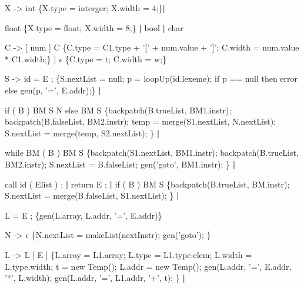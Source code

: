 \documentclass{ML}
\begin{document}
\begin{enumerate}
{    \item X -> int {\color{red}\{X.type = interger; X.width = 4;\}}\textbf{|} 
    
    \hspace{1cm}float {\color{red}\{X.type = float; X.width = 8;\}} \textbf{|}
         bool \textbf{|} char
    \vspace{0.5cm}
    
    \item C -> [ num ] C {\color{red}\{C.type = C1.type + '[' + num.value + ']'; C.width = num.value * C1.width;\}} \textbf{|}
         $\epsilon$ {\color{red}\{C.type = t; C.width = w;\}}
    
         \vspace{0.5cm}
    \item S -> id = E ; {\color{red}\{S.nextList = null; p = loopUp(id.lexeme); if p == null then error else gen(p, '=', E.addr);\}} \textbf{|}
    
    \hspace{1cm}if ( B ) BM S N else BM S {\color{red}\{backpatch(B.trueList, BM1.instr); backpatch(B.falseList, BM2.instr); temp = merge(S1.nextList, N.nextList); S.nextList = merge(temp, S2.nextList); \}} \textbf{|} 
    
    \hspace{1cm}while BM ( B ) BM S {\color{red}\{backpatch(S1.nextList, BM1.instr); backpatch(B.trueList, BM2.instr); S.nextList = B.falseList; gen('goto', BM1.instr); \}} \textbf{|} 
    
    \hspace{1cm}call id ( Elist ) ; \textbf{|} return E ; \textbf{|} if ( B ) BM S {\color{red}\{backpatch(B.trueList, BM.instr); S.nextList = merge(B.falseList, S1.nextList); \}} \textbf{|} 
    
    \hspace{1cm}L = E ; {\color{red}\{gen(L.array, L.addr, '=', E.addr)\}}
    \vspace{0.5cm}
    
    \item N -> $\epsilon$ {\color{red}\{N.nextList = makeList(nextInstr); gen('goto'); \}}
    
    \vspace{0.5cm}
    \item L -> L [ E ] {\color{red}\{L.array = L1.array; L.type = L1.type.elem; L.width = L.type.width; t = new Temp(); L.addr = new Temp(); gen(L.addr, '=', E.addr, '*', L.width); gen(L.addr, '=', L1.addr, '+', t); \}} \textbf{|} 
    
}
\end{enumerate}
\end{document}
